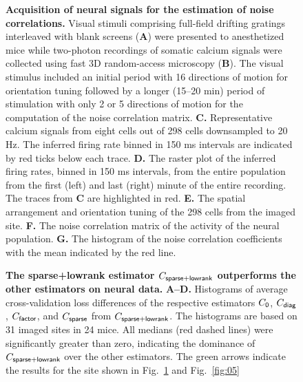 \documentclass[10pt]{article}
\begin{document}
\begin{figure}[!ht]
    \begin{center}
    \end{center}
    \caption{{\bf Acquisition of neural signals for the estimation of noise correlations.}
    Visual stimuli comprising full-field drifting gratings interleaved with blank screens ({\bf A}) were presented to anesthetized mice while two-photon recordings of somatic calcium signals were collected using fast 3D random-access microscopy ({\bf B}). The visual stimulus included an initial period with 16 directions of motion for orientation tuning followed by a longer (15--20 min) period of stimulation with only 2 or 5 directions of motion for the computation of the noise correlation matrix. 
    {\bf C.} Representative calcium signals from eight cells out of 298 cells downsampled to 20 Hz. The inferred firing rate binned in 150 ms intervals are indicated by red ticks below each trace.
    {\bf D.} The raster plot of the inferred firing rates, binned in 150 ms intervals, from the entire population from the first (left) and last (right) minute of the entire recording.  The traces from {\bf C} are highlighted in red.
    {\bf E.} The spatial arrangement and orientation tuning of the 298 cells from the imaged site.
    {\bf F.} The noise correlation matrix of the activity of the neural population. 
    {\bf G.} The histogram of the noise correlation coefficients with the mean indicated by the red line.
}
    \label{fig:03}
\end{figure}

\begin{figure}[!ht]
    \begin{center}
    \end{center}
    \caption{{\bf The sparse+lowrank estimator $C_{\sf sparse+lowrank}$ outperforms the other estimators on neural data.}
    {\bf A--D.} Histograms of average cross-validation loss differences of the respective estimators $C_{\sf 0}$, $C_{\sf diag}$, $C_{\sf factor}$, and $C_{\sf sparse}$ from $C_{\sf sparse+lowrank}$. 
    The histograms are based on 31 imaged sites in 24 mice. 
    All medians (red dashed lines) were significantly greater than zero, indicating the dominance of $C_{\sf sparse+lowrank}$ over the other estimators. 
    The green arrows indicate the results for the site shown in Fig.~\ref{fig:03} and Fig.~\ref{fig:05}
    }
    \label{fig:04}
\end{figure}
        
\end{document}
